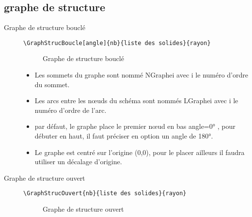 \documentclass[a4paper,11pt]{article}                      %
\begin{document}
\subsection {graphe de structure}
\begin{description}
\item[Graphe de structure bouclé] \verb"\GraphStrucBoucle[angle]{nb}{liste des solides}{rayon}"

\begin{figure}[!ht]
\centering
\begin{tkzexample}[latex=8cm,very small]
\end{tkzexample}
\caption{Graphe de structure bouclé}
\label{fig:graphboucle}
\end{figure}


\begin{itemize}
\item Les sommets du graphe sont nommé NGraphei avec i le numéro d'ordre du sommet.
\item Les arcs entre les n\oe uds du schéma sont nommés LGraphei  avec i le numéro d'ordre de l'arc.
\item par défaut, le graphe place le premier n\oe ud en bas angle=\ang{0} , pour débuter en haut, il faut préciser en option un  angle de \ang{180}.
\item Le graphe est centré sur l'origine (0,0), pour le placer ailleurs il faudra utiliser un décalage d'origine.

\end{itemize}
 

\item[Graphe de structure ouvert] \verb"\GraphStrucOuvert{nb}{liste des solides}{rayon}"


\begin{figure}[!ht]
\centering
\begin{tkzexample}[very small,latex=8cm]
\end{tkzexample}
\caption{Graphe de structure ouvert}
\label{fig:graphboucleouvert}
\end{figure}



\end{description}
\end{document}
